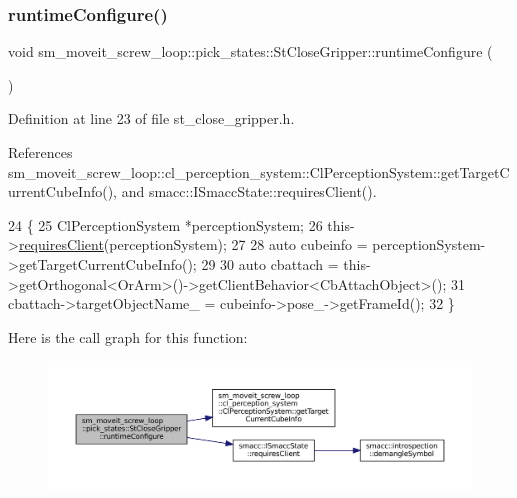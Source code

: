 \subsubsection{\texorpdfstring{runtime\+Configure()}{runtimeConfigure()}}
{\footnotesize\ttfamily void sm\+\_\+moveit\+\_\+screw\+\_\+loop\+::pick\+\_\+states\+::\+St\+Close\+Gripper\+::runtime\+Configure (\begin{DoxyParamCaption}{ }\end{DoxyParamCaption})\hspace{0.3cm}{\ttfamily [inline]}}



Definition at line 23 of file st\+\_\+close\+\_\+gripper.\+h.



References sm\+\_\+moveit\+\_\+screw\+\_\+loop\+::cl\+\_\+perception\+\_\+system\+::\+Cl\+Perception\+System\+::get\+Target\+Current\+Cube\+Info(), and smacc\+::\+I\+Smacc\+State\+::requires\+Client().


\begin{DoxyCode}
24          \{
25             ClPerceptionSystem *perceptionSystem;
26             this->\hyperlink{classsmacc_1_1ISmaccState_a7f95c9f0a6ea2d6f18d1aec0519de4ac}{requiresClient}(perceptionSystem);
27 
28             \textcolor{keyword}{auto} cubeinfo = perceptionSystem->getTargetCurrentCubeInfo();
29 
30             \textcolor{keyword}{auto} cbattach = this->getOrthogonal<OrArm>()->getClientBehavior<CbAttachObject>();
31             cbattach->targetObjectName\_ = cubeinfo->pose\_->getFrameId();
32          \}
\end{DoxyCode}
Here is the call graph for this function\+:
\nopagebreak
\begin{figure}[H]
\begin{center}
\leavevmode
\includegraphics[width=350pt]{structsm__moveit__screw__loop_1_1pick__states_1_1StCloseGripper_a448951288b11f6cebe1ac4efd74e9762_cgraph}
\end{center}
\end{figure}
\mbox{\label{structsm__moveit__screw__loop_1_1pick__states_1_1StCloseGripper_aa9ca2db647e69fe1faa7e15d97826e88}} 
